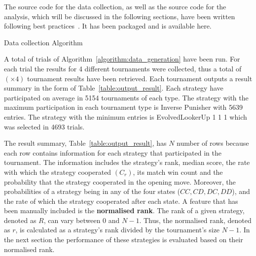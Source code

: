 \documentclass{article}
\newcommand{\uniquenumberofseeds}{}
\newcommand{\numberofalltournaments}{}
\begin{document}
The source code for the data collection, as well as the source code for
the analysis, which will be discussed in the following sections, have been written
following best practices~\cite{Aberdour2007, Benureau2018}. It has been packaged
and is available here. %

\begin{algorithm}[!htbp]
    \;
    \caption{Data collection Algorithm}
    \label{algorithm:data_generation}
\end{algorithm}

A total of \uniquenumberofseeds trials of Algorithm~\ref{algorithm:data_generation} have been
run. For each trial the results for 4 different tournaments were collected,
thus a total of \numberofalltournaments $(\uniquenumberofseeds \times 4)$ tournament results have been
retrieved. Each tournament outputs a result summary in the form of
Table~\ref{table:output_result}. Each strategy have participated on average in
5154 tournaments of each type. The strategy with the maximum participation in each
tournament type is Inverse Punisher with 5639 entries. The strategy with the
minimum entries is EvolvedLookerUp 1 1 1 which was selected in 4693 trials.

The result summary, Table~\ref{table:output_result}, has \(N\) number of rows
because each row contains information for each strategy that participated in the
tournament. The information includes the strategy's rank, median score, the rate
with which the strategy cooperated $(C_r)$, its match win count and the
probability that the strategy cooperated in the opening move. Moreover, the
probabilities of a strategy being in any of the four states ($CC, CD, DC, DD$),
and the rate of which the strategy cooperated after each state. A feature that
has been manually included is the \textbf{normalised rank}. The rank of a given
strategy, denoted as \(R\), can vary between 0 and \(N-1\). Thus, the normalised rank,
denoted as $r$, is calculated as a strategy's rank divided by the tournament's
size \(N - 1\). In the next section the performance of these strategies is evaluated
based on their normalised rank.
\end{document}
